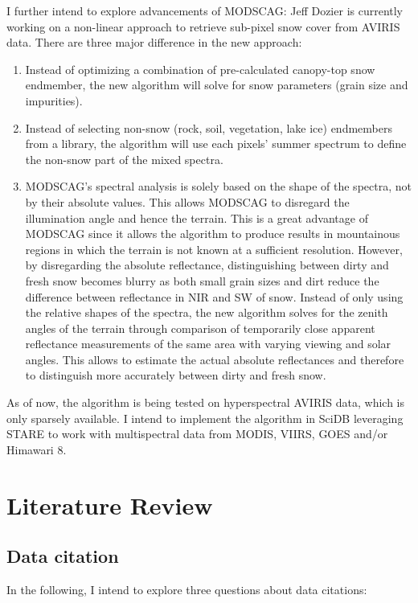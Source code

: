 \documentclass[a4paper,10pt]{article}
\begin{document}
I further intend to explore advancements of \gls{MODSCAG}: Jeff Dozier is currently working on a non-linear approach to retrieve sub-pixel snow cover from \gls{AVIRIS} data. There are three major difference in the new approach:
\begin{enumerate}
 \item Instead of optimizing a combination of pre-calculated canopy-top snow endmember, the new algorithm will solve for snow parameters (grain size and impurities).
 \item Instead of selecting non-snow (rock, soil, vegetation, lake ice) endmembers from a library, the algorithm will use each pixels' summer spectrum to define the non-snow part of the mixed spectra.
 \item \gls{MODSCAG}'s spectral analysis is solely based on the shape of the spectra, not by their absolute values. This allows \gls{MODSCAG} to disregard the illumination angle and hence the terrain. This is a great advantage of \gls{MODSCAG} since it allows the algorithm to produce results in mountainous regions in which the terrain is not known at a sufficient resolution. However, by disregarding the absolute reflectance, distinguishing between dirty and fresh snow becomes blurry as both small grain sizes and dirt reduce the difference between reflectance in \gls{NIR} and \gls{SW} of snow. Instead of only using the relative shapes of the spectra, the new algorithm solves for the zenith angles of the terrain through comparison of temporarily close apparent reflectance measurements of the same area with varying viewing and solar angles. This allows to estimate the actual absolute reflectances and therefore to distinguish more accurately between dirty and fresh snow.
\end{enumerate}

As of now, the algorithm is being tested on hyperspectral \gls{AVIRIS} data, which is only sparsely available. I intend to implement the algorithm in SciDB leveraging \gls{STARE} to work with multispectral data from \gls{MODIS}, \gls{VIIRS}, \gls{GOES} and/or Himawari 8.


\newpage
\section{Literature Review}

\subsection{Data citation}
In the following, I intend to explore three questions about data citations:
\end{document}
